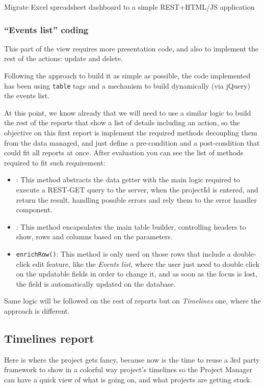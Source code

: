 \begin{part}{Migrate Excel spreadsheet dashboard to a simple REST+HTML/JS
application}
\subsubsection{``Events list'' coding}
\label{sec:eventlist}

This part of the view requires more presentation code, and also to
implement the rest of the actions: update and delete.

Following the approach to build it as simple as possible, the code implemented
has been using \texttt{table} tags and a mechanism to build dynamically (via
jQuery) the events list. 

At this point, we know already that we will need to use a similar logic to build
the rest of the reports that show a list of details including an action, so the
objective on this first report is implement the required methods decoupling them
from the data managed, and just define a pre-condition and a post-condition that
could fit all reports at once. After evaluation you can see the list of methods
required to fit such requirement:

\begin{itemize}
  \item {}: This method abstracts the data getter with the main
  logic required to execute a REST-GET query to the server, when the projectId
  is entered, and return the result, handling possible errors and rely them to
  the error handler component.
  \item {}: This method encapsulates the main table builder,
  controlling headers to show, rows and columns based on the parameters.
  \item \texttt{enrichRow()}: This method is only used on those rows that
  include a double-click edit feature, like the \emph{Events list}, where the
  user just need to double click on the updatable fields in order to change
  it, and as soon as the focus is lost, the field is automatically updated on
  the database.
\end{itemize}

Same logic will be followed on the rest of reports but on \emph{Timelines} one,
where the approach is different.

\subsection{Timelines report}
Here is where the project gets fancy, because now is the time to reuse a 3rd
party framework to show in a colorful way project's timelines so the Project
Manager can have a quick view of what is going on, and what projects are getting
stuck.


\end{part}
